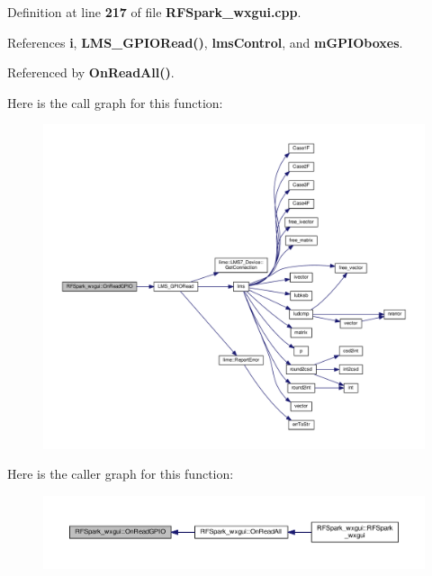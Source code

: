 Definition at line {\bf 217} of file {\bf R\+F\+Spark\+\_\+wxgui.\+cpp}.



References {\bf i}, {\bf L\+M\+S\+\_\+\+G\+P\+I\+O\+Read()}, {\bf lms\+Control}, and {\bf m\+G\+P\+I\+Oboxes}.



Referenced by {\bf On\+Read\+All()}.



Here is the call graph for this function\+:
\nopagebreak
\begin{figure}[H]
\begin{center}
\leavevmode
\includegraphics[width=350pt]{d0/d75/classRFSpark__wxgui_a1c8760c24433b3d9956c94d7265806db_cgraph}
\end{center}
\end{figure}




Here is the caller graph for this function\+:
\nopagebreak
\begin{figure}[H]
\begin{center}
\leavevmode
\includegraphics[width=350pt]{d0/d75/classRFSpark__wxgui_a1c8760c24433b3d9956c94d7265806db_icgraph}
\end{center}
\end{figure}


